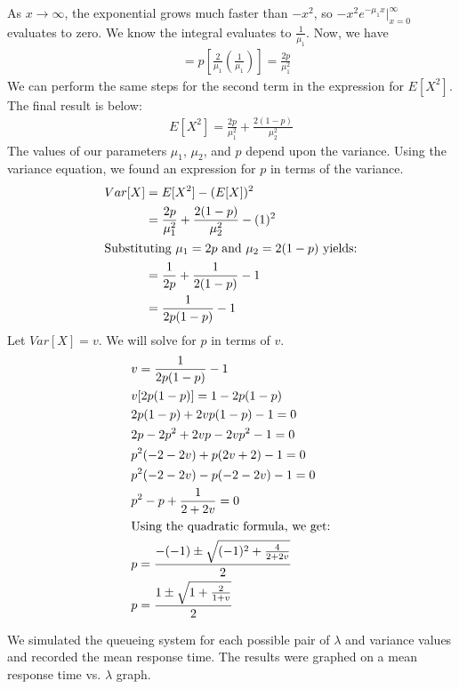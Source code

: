 \documentclass[12pt]{article}
\begin{document}
 As $x \rightarrow \infty$, the exponential grows much faster than $-x^2$, so $-x^2e^{-\mu_1 x} \biggr\rvert_{x = 0}^{\infty}$ evaluates to zero. We know the integral evaluates to $\frac{1}{\mu_1}$. Now, we have
\begin{align*}
&= p[\frac{2}{\mu_1}(\frac{1}{\mu_1})] = \frac{2p}{\mu_1^2}
\end{align*}
We can perform the same steps for the second term in the expression for $E[X^2]$. The final result is below:
\begin{align*}
E[X^2] = \frac{2p}{\mu_1^2} + \frac{2(1-p)}{\mu_2^2}
\end{align*}
The values of our parameters $\mu_1$, $\mu_2$, and $p$ depend upon the variance. Using the variance equation, we found an expression for $p$ in terms of the variance. 
\begin{align*} 
Var[X] &= E[X^2] - (E[X])^2 \\
&= \frac{2p}{\mu_1^2} + \frac{2(1-p)}{\mu_2^2} - (1)^2 \\
\intertext{Substituting $\mu_1 = 2p$ and $\mu_2 = 2(1-p)$ yields:} 
&= \frac{1}{2p} + \frac{1}{2(1-p)} - 1 \\ 
&= \frac{1}{2p(1-p)} - 1
\end{align*}
Let $Var[X] = v$. We will solve for $p$ in terms of $v$. 
\begin{align*} 
&v = \frac{1}{2p(1-p)} - 1 \\
&v[2p(1-p)] = 1 - 2p(1-p) \\ 
&2p(1-p) + 2vp(1-p) - 1 = 0 \\ 
&2p - 2p^2 + 2vp - 2vp^2 - 1 = 0 \\
&p^2(-2 - 2v) + p(2v + 2) - 1 = 0 \\ 
&p^2(-2 - 2v) - p(-2 - 2v) - 1 = 0 \\ 
&p^2 - p + \frac{1}{2 + 2v} = 0 \\ 
\intertext{Using the quadratic formula, we get:} 
&p = \frac{-(-1) \pm \sqrt{(-1)^2 + \frac{4}{2+2v}}}{2} \\
&p = \frac{1 \pm \sqrt{1 + \frac{2}{1+v}}}{2}
\end{align*}

We simulated the queueing system for each possible pair of $\lambda$ and variance values and recorded the mean response time. The results were graphed on a mean response time vs. $\lambda$ graph. \\
\end{document}
